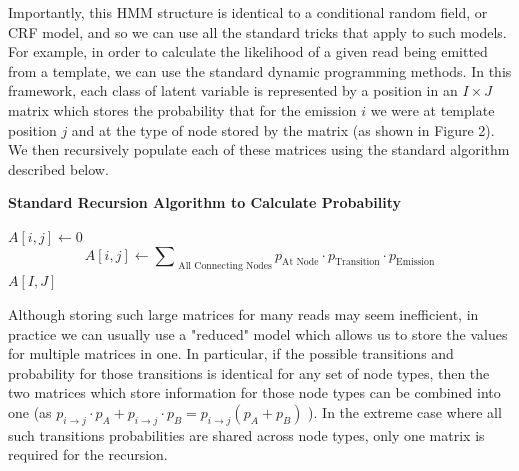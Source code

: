 \documentclass[fleqn,10pt]{SelfArx} %
\begin{document}
Importantly, this HMM structure is identical to a conditional random field, or CRF model, and so we can use all the standard tricks that apply to such models.  For example, in order to calculate the likelihood of a given read being emitted from a template, we can use the standard dynamic programming methods.  In this framework, each class of latent variable is represented by a position in an $ I \times J$ matrix which stores the probability that for the emission $i$ we were at template position $j$ and at the type of node stored by the matrix (as shown in Figure 2).  We then recursively populate each of these matrices using the standard algorithm described below.

\begin{algorithm}
\caption*{\textbf{Standard Recursion Algorithm to Calculate Probability }}
\label{calcScore}
\begin{algorithmic}[h]
\STATE $A[i,j] \leftarrow 0$
\ELSE
\STATE \[
	A[i,j]  \leftarrow \sum\nolimits_{\text{ All Connecting Nodes} } p_{\text{At Node}} \cdot p_{\text{Transition}} \cdot p_{\text{Emission}}
	\]
\ENDIF	
\ENDFOR
\ENDFOR
\RETURN $A[I,J]$
\end{algorithmic}
\end{algorithm}



Although storing such large matrices for many reads may seem inefficient, in practice we can usually use a "reduced" model which allows us to store the values for multiple matrices in one.  In particular, if the possible transitions and probability for those transitions is identical for any set of node types, then the two matrices which store information for those node types can be combined into one (as  $p_{i \rightarrow j} \cdot p_{A} + p_{i \rightarrow j} \cdot p_{B} = p_{i \rightarrow j} (p_{A} + p_{B})  $ ).  In the extreme case where all such transitions probabilities are shared across node types, only one matrix is required for the recursion.
\end{document}

